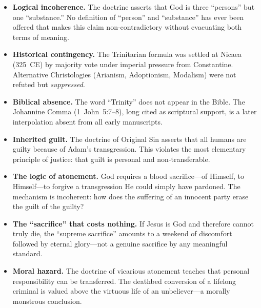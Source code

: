 \documentclass[11pt,twoside]{article}
\begin{document}
\begin{scheda}

\begin{itemize}
  \item \textbf{Logical incoherence.}
    The doctrine asserts that God is three ``persons'' but one ``substance.''
    No definition of ``person'' and ``substance'' has ever been offered that
    makes this claim non-contradictory without evacuating both terms of
    meaning.
  \item \textbf{Historical contingency.}
    The Trinitarian formula was settled at Nicaea
    (325~CE) by majority vote under imperial pressure from
    Constantine.  Alternative Christologies
    (Arianism, Adoptionism,
    Modalism) were not refuted but \emph{suppressed}.
  \item \textbf{Biblical absence.}
    The word ``Trinity'' does not appear in the Bible.  The Johannine
    Comma (1~John~5:7--8), long cited as scriptural
    support, is a later interpolation absent from all early manuscripts.
\end{itemize}
\end{scheda}

\begin{scheda}

\begin{itemize}
  \item \textbf{Inherited guilt.}
    The doctrine of Original Sin asserts that all humans
    are guilty because of Adam's transgression.  This violates the most
    elementary principle of justice: that guilt is personal and
    non-transferable.
  \item \textbf{The logic of atonement.}
    God requires a blood sacrifice---of Himself, to
    Himself---to forgive a transgression He could simply have pardoned.
    The mechanism is incoherent: how does the suffering of an innocent party
    erase the guilt of the guilty?
  \item \textbf{The ``sacrifice'' that costs nothing.}
    If Jesus is God and therefore cannot truly die, the ``supreme sacrifice''
    amounts to a weekend of discomfort followed by eternal glory---not a
    genuine sacrifice by any meaningful standard.
  \item \textbf{Moral hazard.}
    The doctrine of vicarious atonement teaches that personal responsibility
    can be transferred.  The deathbed conversion
    of a lifelong criminal is valued above the virtuous life of an
    unbeliever---a morally monstrous conclusion.
\end{itemize}
\end{scheda}
\end{document}

